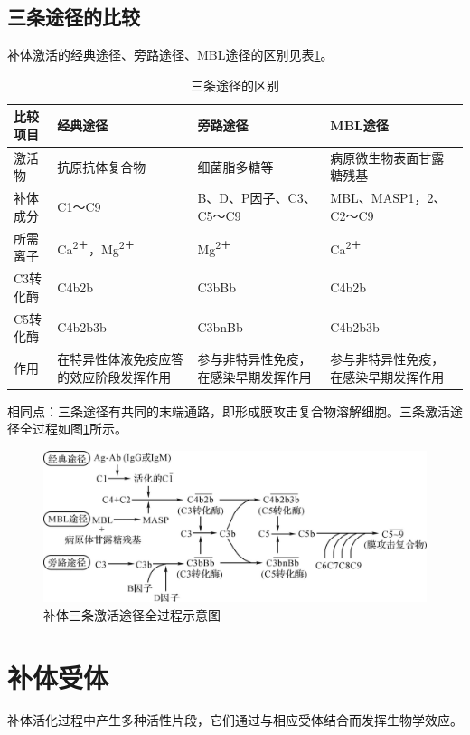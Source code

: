 \subsection{三条途径的比较}

补体激活的经典途径、旁路途径、MBL途径的区别见表\ref{tab5-1}。

\begin{longtable}[!t]{lp{4cm}p{4cm}p{4cm}}
    \caption{三条途径的区别}
    \label{tab5-1}\\
\toprule
比较项目 & 经典途径 & 旁路途径 & MBL途径\tabularnewline
\midrule
\endhead
激活物&抗原抗体复合物&细菌脂多糖等&病原微生物表面甘露糖残基\\
补体成分& C1～C9&B、D、P因子、C3、 C5～C9& MBL、MASP1，2、C2～C9\\
所需离子&Ca\textsuperscript{2＋}，Mg\textsuperscript{2＋}&Mg\textsuperscript{2＋}&Ca\textsuperscript{2＋}\\
C3转化酶&C4b2b&C3bBb&C4b2b\\
C5转化酶&C4b2b3b&C3bnBb&C4b2b3b\\
作用&在特异性体液免疫应答的效应阶段发挥作用&参与非特异性免疫，在感染早期发挥作用&参与非特异性免疫，在感染早期发挥作用\\
\bottomrule
\end{longtable}

相同点：三条途径有共同的末端通路，即形成膜攻击复合物溶解细胞。三条激活途径全过程如图\ref{fig5-8}所示。

\begin{figure}[!t]
 \centering
 \includegraphics{./images/Image00086.jpg}
 \captionsetup{justification=centering}
 \caption{补体三条激活途径全过程示意图}
 \label{fig5-8}
  \end{figure} 

\section{补体受体}

补体活化过程中产生多种活性片段，它们通过与相应受体结合而发挥生物学效应。

